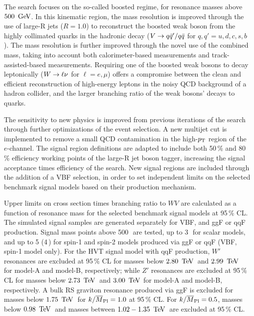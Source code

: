 The search focuses on the so-called boosted regime, for resonance masses above $500\,\GeV$. In this kinematic region, the mass resolution is improved through the use of large-R jets ($R=1.0$) to reconstruct the boosted weak boson from the highly collimated quarks in the hadronic decay ($V\rightarrow q\bar{q}'/q\bar{q}$ for $q,q'=u,d,c,s,b$). The mass resolution is further improved through the novel use of the combined mass, taking into account both calorimeter-based measurements and track-assisted-based measurements. Requiring one of the boosted weak bosons to decay leptonically ($W\rightarrow\ell\nu$ for $\ell=e,\mu$) offers a compromise between the clean and efficient reconstruction of high-energy leptons in the noisy QCD background of a hadron collider, and the larger branching ratio of the weak bosons' decays to quarks. 

The sensitivity to new physics is improved from previous iterations of the search through further optimizations of the event selection. A new multijet cut is implemented to remove a small QCD contamination in the high-$p_{\text{T}}$ region of the $e$-channel. The signal region definitions are adapted to include both 50\,\% and 80\,\% efficiency working points of the large-R jet boson tagger, increasing the signal acceptance times efficiency of the search.  New signal regions are included through the addition of a VBF selection, in order to set independent limits on the selected benchmark signal models based on their production mechanism. 


Upper limits on cross section times branching ratio to $WV$ are calculated as a function of resonance mass for the selected benchmark signal models at 95\,\% CL. The simulated signal samples are generated separately for VBF, and ggF or qqF production. Signal mass points above 500\,\GeV\, are tested, up to 3\,\TeV\, for scalar models, and up to 5\,\TeV\,(4\,\TeV) for spin-1 and spin-2 models produced via ggF or qqF (VBF, spin-1 model only). For the HVT signal model with qqF production, $W'$ resonances are excluded at 95\,\% CL for masses below $2.80\,\TeV$\, and $2.99\,\TeV$\, for model-A and model-B, respectively; while $Z'$ resonances are excluded at 95\,\% CL for masses below $2.73\,\TeV$\, and $3.00\,\TeV$ for model-A and model-B, respectively. A bulk RS graviton resonance produced via ggF is excluded for masses below $1.75\,\TeV$\, for $k/\overline{M}_{\rm Pl}=1.0$ at 95\,\% CL. For $k/\overline{M}_{\rm Pl}=0.5$, masses below $0.98\,\TeV$\, and masses between $1.02-1.35\,\TeV$\, are excluded at 95\,\% CL.  

